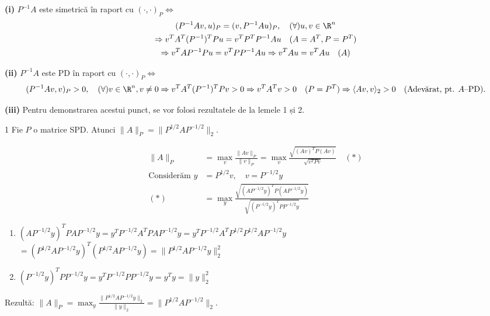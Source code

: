 \begin{demonstratie}

    \bigskip

    \noindent \textbf{(i)} $P^{-1}A$ este simetrică în raport cu $(\cdot, \cdot)_P \iff$
    \begin{gather*}
        (P^{-1}A v, u)_P = (v, P^{-1}A u)_P, \quad (\forall) u, v \in \R^n \\
        \Rightarrow v^T A^T (P^{-1})^T P u = v^T P^T P^{-1} A u \quad (A=A^T, P=P^T) \\
        \Rightarrow v^T A P^{-1} P u = v^T P P^{-1} A u \Rightarrow v^T A u = v^T A u \quad (A) \\
    \end{gather*}

    \noindent \textbf{(ii)} $P^{-1}A$ este PD în raport cu $(\cdot, \cdot)_P \iff$
    \begin{gather*}
        (P^{-1}A v, v)_P > 0, \quad (\forall) v \in \R^n, v \neq 0 
        \Rightarrow v^T A^T (P^{-1})^T P v > 0 \Rightarrow v^T A^T v > 0 \quad (P=P^T)
        \Rightarrow \langle A v, v \rangle_2 > 0 \quad (\text{Adevărat, pt. } A\text{--PD}). 
    \end{gather*}

    \vspace{1em}
    \noindent \textbf{(iii)} Pentru demonstrarea acestui punct, se vor folosi rezultatele de la lemele 1 și 2.

    \bigskip

    \begin{lema}{1} 
        Fie $P$ o matrice SPD. Atunci $\| A \|_P = \| P^{1/2} A P^{-1/2} \|_2$.
    \end{lema}

    \begin{demonstratie}
        \begin{align*}
            \| A \|_P &= \max_v \frac{\| A v \|_P}{\| v \|_P} = \max_v \frac{\sqrt{(Av)^T P (Av)}}{\sqrt{v^T P v}} \quad (*) \\
            \text{Considerăm } y &= P^{1/2}v, \quad v = P^{-1/2}y \\
            (*) &= \max_y \frac{\sqrt{(A P^{-1/2} y)^T P (A P^{-1/2} y)}}{\sqrt{(P^{-1/2} y)^T P P^{-1/2} y}} 
        \end{align*}
        \begin{enumerate}
            \item $(A P^{-1/2} y)^T P A P^{-1/2} y = y^T P^{-1/2} A^T P A P^{-1/2} y = y^T P^{-1/2} A^T P^{1/2} P^{1/2} A P^{-1/2} y$ \\
            $= (P^{1/2} A P^{-1/2} y)^T (P^{1/2} A P^{-1/2} y) = \| P^{1/2} A P^{-1/2} y \|_2^2$
            \item $(P^{-1/2} y)^T P P^{-1/2} y = y^T P^{-1/2} P P^{-1/2} y = y^T y = \| y \|_2^2$
        \end{enumerate}
        Rezultă: $\| A \|_P = \max_y \frac{\| P^{1/2} A P^{-1/2} y \|_2}{\| y \|_2} = \| P^{1/2} A P^{-1/2} \|_2. $
    \end{demonstratie}


\end{demonstratie}
